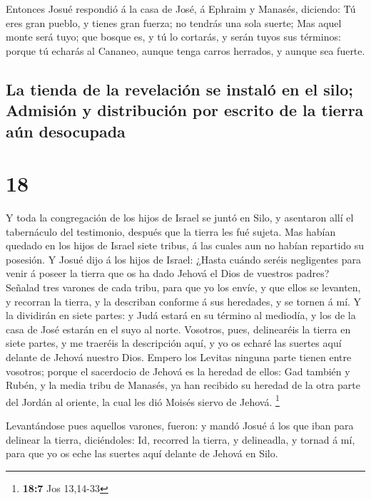  Entonces Josué respondió á la casa de José, á Ephraim y
Manasés, diciendo: Tú eres gran pueblo, y tienes gran fuerza; no tendrás
una sola suerte;  Mas aquel monte será tuyo; que bosque es,
y tú lo cortarás, y serán tuyos sus términos: porque tú echarás al
Cananeo, aunque tenga carros herrados, y aunque sea fuerte.

\hypertarget{la-tienda-de-la-revelaciuxf3n-se-instaluxf3-en-el-silo-admisiuxf3n-y-distribuciuxf3n-por-escrito-de-la-tierra-auxfan-desocupada}{%
\subsection{La tienda de la revelación se instaló en el silo; Admisión y
distribución por escrito de la tierra aún
desocupada}\label{la-tienda-de-la-revelaciuxf3n-se-instaluxf3-en-el-silo-admisiuxf3n-y-distribuciuxf3n-por-escrito-de-la-tierra-auxfan-desocupada}}

\hypertarget{section-17}{%
\section{18}\label{section-17}}

 Y toda la congregación de los hijos de Israel se juntó en
Silo, y asentaron allí el tabernáculo del testimonio, después que la
tierra les fué sujeta.  Mas habían quedado en los hijos de
Israel siete tribus, á las cuales aun no habían repartido su posesión.
 Y Josué dijo á los hijos de Israel: ¿Hasta cuándo seréis
negligentes para venir á poseer la tierra que os ha dado Jehová el Dios
de vuestros padres?  Señalad tres varones de cada tribu,
para que yo los envíe, y que ellos se levanten, y recorran la tierra, y
la describan conforme á sus heredades, y se tornen á mí.  Y
la dividirán en siete partes: y Judá estará en su término al mediodía, y
los de la casa de José estarán en el suyo al norte. 
Vosotros, pues, delinearéis la tierra en siete partes, y me traeréis la
descripción aquí, y yo os echaré las suertes aquí delante de Jehová
nuestro Dios.  Empero los Levitas ninguna parte tienen entre
vosotros; porque el sacerdocio de Jehová es la heredad de ellos: Gad
también y Rubén, y la media tribu de Manasés, ya han recibido su heredad
de la otra parte del Jordán al oriente, la cual les dió Moisés siervo de
Jehová. \footnote{\textbf{18:7} Jos 13,14-33}

 Levantándose pues aquellos varones, fueron: y mandó Josué á
los que iban para delinear la tierra, diciéndoles: Id, recorred la
tierra, y delineadla, y tornad á mí, para que yo os eche las suertes
aquí delante de Jehová en Silo.

